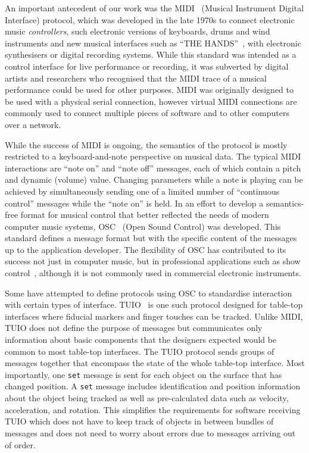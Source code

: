 \documentclass[graybox]{svmult}
\begin{document}
An important antecedent of our work was the
MIDI~\cite{midi1996complete} (Musical Instrument Digital Interface)
protocol, which was developed in the late 1970s to connect electronic
music \emph{controllers}, such electronic versions of keyboards, drums
and wind instruments and new musical interfaces such as ``THE
HANDS''~\cite{TheHandsArticle}, with electronic synthesisers or
digital recording systems. While this standard was intended as a
control interface for live performance or recording, it was subverted
by digital artists and researchers who recognised that the MIDI trace
of a musical performance could be used for other purposes. MIDI was
originally designed to be used with a physical serial connection,
however virtual MIDI connections are commonly used to connect multiple
pieces of software and to other computers over a
network\cite{Lazzaro:2004pb}.

While the success of MIDI is ongoing, the semantics of the protocol is
mostly restricted to a keyboard-and-note perspective on musical data.
The typical MIDI interactions are ``note on'' and ``note off''
messages, each of which contain a pitch and dynamic (volume) value.
Changing parameters while a note is playing can be achieved by
simultaneously sending one of a limited number of ``continuous
control'' messages while the ``note on'' is held. In an effort to
develop a semantics-free format for musical control that better
reflected the needs of modern computer music systems,
OSC~\cite{osc-nime2009} (Open Sound Control) was developed. This
standard defines a message format but with the specific content of the
messages up to the application developer. The flexibility of OSC has
contributed to its success not just in computer music, but in
professional applications such as show
control~\cite{schmeder2010best}, although it is not commonly used in
commercial electronic instruments.

Some have attempted to define protocols using OSC to standardise
interaction with certain types of interface. TUIO~\cite{TUIO_KBBC05}
is one such protocol designed for table-top interfaces where fiducial
markers and finger touches can be tracked. Unlike MIDI, TUIO does not
define the purpose of messages but communicates only information about
basic components that the designers expected would be common to most
table-top interfaces. The TUIO protocol sends groups of messages
together that encompass the state of the whole table-top interface.
Most importantly, one \texttt{set} message is sent for each object on
the surface that has changed position. A \texttt{set} message includes
identification and position information about the object being tracked
as well as pre-calculated data such as velocity, acceleration, and
rotation. This simplifies the requirements for software receiving TUIO
which does not have to keep track of objects in between bundles of
messages and does not need to worry about errors due to messages arriving out of order.
\end{document}
